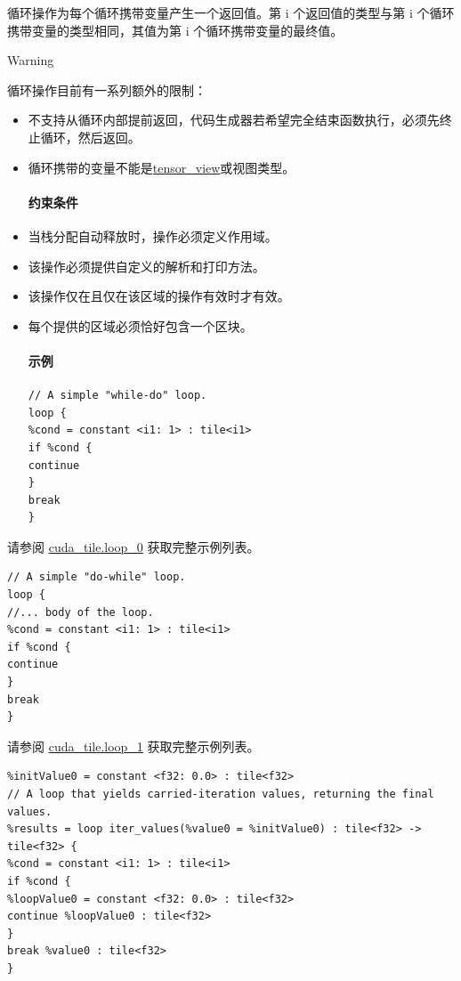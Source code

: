 \documentclass{article}
\begin{document}
循环操作为每个循环携带变量产生一个返回值。第 i 个返回值的类型与第 i 个循环携带变量的类型相同，其值为第 i 个循环携带变量的最终值。


Warning


循环操作目前有一系列额外的限制：


\begin{itemize}
\item 不支持从循环内部提前返回，代码生成器若希望完全结束函数执行，必须先终止循环，然后返回。
\item 循环携带的变量不能是\href{https://docs.nvidia.com/cuda/tile-ir/latest/sections/types.html#type-tensor-view}{tensor\_view}或视图类型。


\paragraph{约束条件}

\item 当栈分配自动释放时，操作必须定义作用域。
\item 该操作必须提供自定义的解析和打印方法。
\item 该操作仅在且仅在该区域的操作有效时才有效。
\item 每个提供的区域必须恰好包含一个区块。


\paragraph{示例}

\begin{lstlisting}
// A simple "while-do" loop.
loop {
%cond = constant <i1: 1> : tile<i1>
if %cond {
continue
}
break
}
\end{lstlisting}

\end{itemize}
请参阅 \href{https://docs.nvidia.com/cuda/tile-ir/latest/sections/appendix.html#example-cuda-tile-loop-0}{cuda\_tile.loop\_0} 获取完整示例列表。


\begin{lstlisting}
// A simple "do-while" loop.
loop {
//... body of the loop.
%cond = constant <i1: 1> : tile<i1>
if %cond {
continue
}
break
}
\end{lstlisting}

请参阅 \href{https://docs.nvidia.com/cuda/tile-ir/latest/sections/appendix.html#example-cuda-tile-loop-1}{cuda\_tile.loop\_1} 获取完整示例列表。


\begin{lstlisting}
%initValue0 = constant <f32: 0.0> : tile<f32>
// A loop that yields carried-iteration values, returning the final values.
%results = loop iter_values(%value0 = %initValue0) : tile<f32> -> tile<f32> {
%cond = constant <i1: 1> : tile<i1>
if %cond {
%loopValue0 = constant <f32: 0.0> : tile<f32>
continue %loopValue0 : tile<f32>
}
break %value0 : tile<f32>
}
\end{lstlisting}
\end{document}
